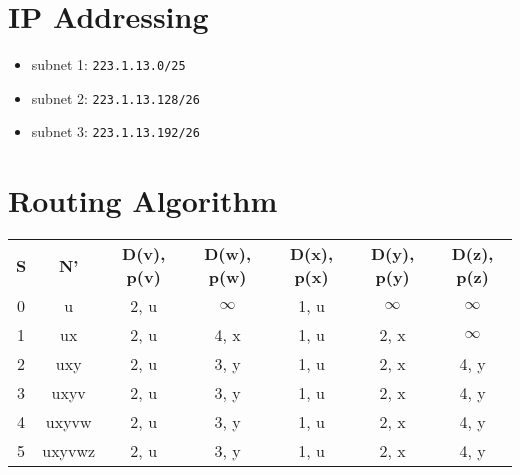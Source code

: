 \documentclass[12pt]{article}
\newcommand{\ilc}{\texttt}
\begin{document}
\section{IP Addressing}

\begin{itemize}
    \item subnet 1: \ilc{223.1.13.0/25}
    \item subnet 2: \ilc{223.1.13.128/26}
    \item subnet 3: \ilc{223.1.13.192/26}
\end{itemize}

%
% 
% 

\section{Routing Algorithm}


\begin{table}[H]
\centering
\begin{tabular}{ccccccc}
\textbf{S} & \textbf{N'} & \textbf{D(v),  p(v)} & \textbf{D(w), p(w)} & \textbf{D(x), p(x)} & \textbf{D(y), p(y)} & \textbf{D(z), p(z)} \\
0          & u           & 2, u                 & $\infty$                 & 1, u                & $\infty$                 & $\infty$                 \\
1          & ux          & 2, u                 & 4, x                & 1, u                & 2, x                & $\infty$                 \\
2          & uxy         & 2, u                 & 3, y                & 1, u                & 2, x                & 4, y                \\
3          & uxyv        & 2, u                 & 3, y                & 1, u                & 2, x                & 4, y                \\
4          & uxyvw       & 2, u                 & 3, y                & 1, u                & 2, x                & 4, y                \\
5          & uxyvwz      & 2, u                 & 3, y                & 1, u                & 2, x                & 4, y
\end{tabular}
\end{table}
\end{document}
